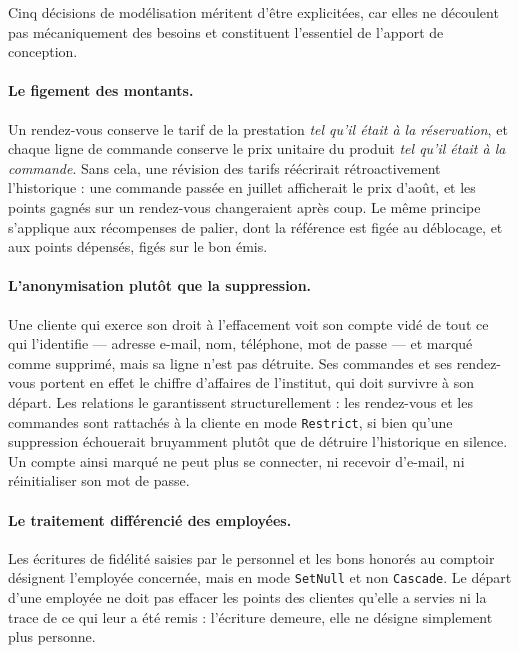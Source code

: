 Cinq décisions de modélisation méritent d'être explicitées, car elles ne
découlent pas mécaniquement des besoins et constituent l'essentiel de l'apport
de conception.

\paragraph{Le figement des montants.} Un rendez-vous conserve le tarif de la
prestation \emph{tel qu'il était à la réservation}, et chaque ligne de commande
conserve le prix unitaire du produit \emph{tel qu'il était à la commande}.
Sans cela, une révision des tarifs réécrirait rétroactivement l'historique :
une commande passée en juillet afficherait le prix d'août, et les points gagnés
sur un rendez-vous changeraient après coup. Le même principe s'applique aux
récompenses de palier, dont la référence est figée au déblocage, et aux points
dépensés, figés sur le bon émis.

\paragraph{L'anonymisation plutôt que la suppression.} Une cliente qui exerce
son droit à l'effacement voit son compte vidé de tout ce qui l'identifie ---
adresse e-mail, nom, téléphone, mot de passe --- et marqué comme supprimé, mais
sa ligne n'est pas détruite. Ses commandes et ses rendez-vous portent en effet
le chiffre d'affaires de l'institut, qui doit survivre à son départ. Les
relations le garantissent structurellement : les rendez-vous et les commandes
sont rattachés à la cliente en mode \texttt{Restrict}, si bien qu'une
suppression échouerait bruyamment plutôt que de détruire l'historique en
silence. Un compte ainsi marqué ne peut plus se connecter, ni recevoir
d'e-mail, ni réinitialiser son mot de passe.

\paragraph{Le traitement différencié des employées.} Les écritures de fidélité
saisies par le personnel et les bons honorés au comptoir désignent l'employée
concernée, mais en mode \texttt{SetNull} et non \texttt{Cascade}. Le départ
d'une employée ne doit pas effacer les points des clientes qu'elle a servies ni
la trace de ce qui leur a été remis : l'écriture demeure, elle ne désigne
simplement plus personne.

